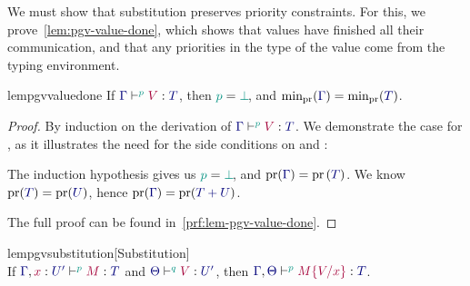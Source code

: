 \documentclass[main.tex]{subfiles}
\begin{document}
We must show that substitution preserves priority constraints. For this, we prove~\cref{lem:pgv-value-done}, which shows that values have finished all their communication, and that any priorities in the type of the value come from the typing environment.
  \begin{restatablelemma}{lempgvvaluedone}
    \label{lem:pgv-value-done}
    If $\tseq[\cs{p}]{\ty{\Gamma}}{V}{T}$, then $\cs{p}=\cs{\pbot}$, and $\minpr(\ty{\Gamma})=\minpr(\ty{T})$.
  \end{restatablelemma}
  \begin{proof}
    By induction on the derivation of $\tseq[\cs{p}]{\ty{\Gamma}}{V}{T}$. We demonstrate the case for , as it illustrates the need for the side conditions on  and :
    \begin{case*}
      The induction hypothesis gives us $\cs{p}=\cs{\pbot}$, and $\pr(\ty{\Gamma})=\pr{(\ty{T})}$. We know $\pr(\ty{T})=\pr({\ty{U}})$, hence $\pr(\ty{\Gamma})=\pr(\ty{\tysum{T}{U}})$.
      \begin{mathpar}
        \small
      \end{mathpar}
    \end{case*}
    The full proof can be found in~\cref{prf:lem-pgv-value-done}.
  \end{proof}
  \begin{restatablelemma}{lempgvsubstitution}[Substitution]
    \label{lem:pgv-substitution}
    \hfill\\%
    If $\tseq[\cs{p}]{\ty{\Gamma},\tmty{x}{U'}}{M}{T}$ and $\tseq[\cs{q}]{\ty{\Theta}}{V}{U'}$, then $\tseq[\cs{p}]{\ty{\Gamma},\ty{\Theta}}{\subst{M}{V}{x}}{T}$.
  \end{restatablelemma}
\end{document}
